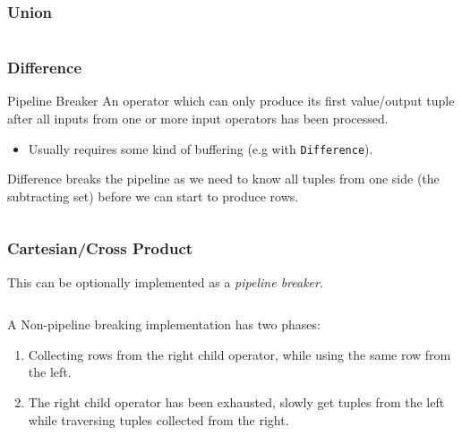 \subsubsection{Union}
\inputminted[firstline=97, lastline=120]{cpp}{processing_models/code/volcano/operators.h}

\subsubsection{Difference}

\begin{definitionbox}{Pipeline Breaker}
  An operator which can only produce its first value/output tuple after all inputs from one or more input operators has been processed.
  \begin{itemize}
    \item Usually requires some kind of buffering (e.g with \texttt{Difference}).
  \end{itemize}
\end{definitionbox}

Difference breaks the pipeline as we need to know all tuples from one side (the subtracting set) before we can start to produce rows.

\inputminted[firstline=127, lastline=162]{cpp}{processing_models/code/volcano/operators.h}

\subsubsection{Cartesian/Cross Product}
This can be optionally implemented as a \textit{pipeline breaker}.

\inputminted[firstline=164, lastline=217]{cpp}{processing_models/code/volcano/operators.h}

A Non-pipeline breaking implementation has two phases:
\begin{enumerate}
  \item Collecting rows from the right child operator, while using the same row from the left.
  \item The right child operator has been exhausted, slowly get tuples from the left while traversing tuples collected from the right.
\end{enumerate}
\inputminted[firstline=219, lastline=270]{cpp}{processing_models/code/volcano/operators.h}

